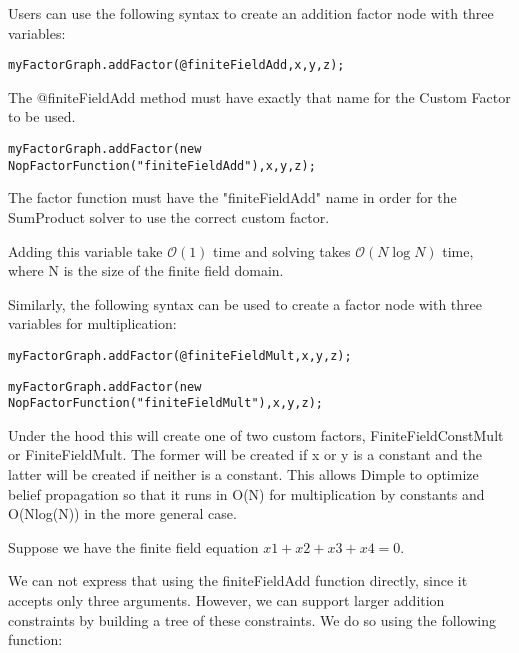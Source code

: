 \fi


Users can use the following syntax to create an addition factor node with three variables:

\ifmatlab
\begin{lstlisting}
myFactorGraph.addFactor(@finiteFieldAdd,x,y,z);
\end{lstlisting}

The @finiteFieldAdd method must have exactly that name for the Custom Factor to be used.
\fi

\ifjava
\begin{lstlisting}
myFactorGraph.addFactor(new NopFactorFunction("finiteFieldAdd"),x,y,z);
\end{lstlisting}

The factor function must have the "finiteFieldAdd" name in order for the SumProduct solver to use the correct custom factor.
\fi

Adding this variable take $\mathcal{O}(1)$ time and solving takes $\mathcal{O}(N\log N)$ time, where N is the size of the finite field domain.


Similarly, the following syntax can be used to create a factor node with three variables for multiplication:

\ifmatlab
\begin{lstlisting}
myFactorGraph.addFactor(@finiteFieldMult,x,y,z);
\end{lstlisting}
\fi

\ifjava
\begin{lstlisting}
myFactorGraph.addFactor(new NopFactorFunction("finiteFieldMult"),x,y,z);
\end{lstlisting}
\fi

Under the hood this will create one of two custom factors, FiniteFieldConstMult or FiniteFieldMult. The former will be created if x or y is a constant and the latter will be created if neither is a constant. This allows Dimple to optimize belief propagation so that it runs in O(N) for multiplication by constants and O(Nlog(N)) in the more general case.

\ifmatlab


Suppose we have the finite field equation $ x1+x2+x3+x4=0 $.

We can not express that using the finiteFieldAdd function directly, since it accepts only three arguments. However, we can support larger addition constraints by building a tree of these constraints. We do so using the following function:

